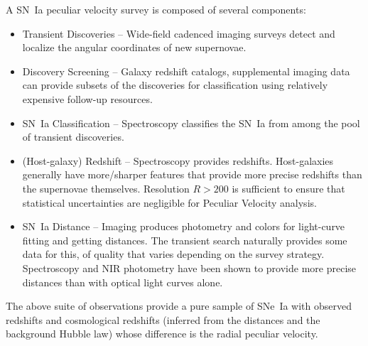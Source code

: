 %




A SN~Ia peculiar velocity survey is composed of several components:
\begin{itemize}
\item Transient Discoveries -- Wide-field cadenced imaging surveys detect and localize the angular coordinates of new supernovae.
\item Discovery Screening -- Galaxy redshift catalogs, supplemental imaging data can provide subsets of the discoveries for classification
using relatively expensive follow-up resources.
\item SN~Ia Classification -- Spectroscopy classifies the SN~Ia from among the pool of  transient discoveries. 
\item (Host-galaxy) Redshift -- Spectroscopy provides redshifts. 
Host-galaxies generally have more/sharper features that provide more precise redshifts than the supernovae themselves. Resolution $R>200$
is sufficient to ensure that statistical uncertainties are negligible for Peculiar Velocity analysis.
\item SN~Ia Distance -- Imaging produces photometry and colors for light-curve fitting and getting distances.  The transient search naturally provides some data
for this, of quality that varies depending on the survey strategy.
Spectroscopy and NIR photometry
have been shown to provide more precise distances than with optical light curves alone.
\end{itemize}
The above suite of observations provide a pure sample of SNe~Ia with observed redshifts and cosmological redshifts (inferred from the distances and
the background Hubble law)
whose difference is the radial peculiar velocity.

